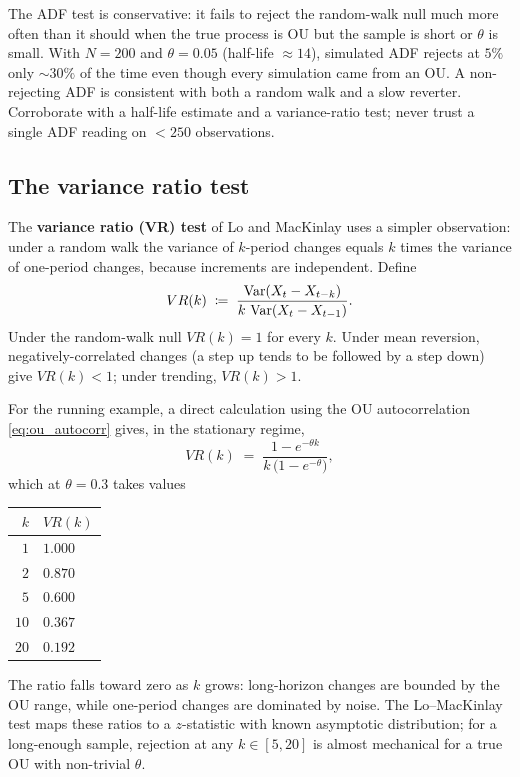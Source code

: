 \begin{pitfallbox}
The ADF test is conservative: it fails to reject the random-walk
null much more often than it should when the true process is OU
but the sample is short or $\theta$ is small. With $N=200$ and
$\theta = 0.05$ (half-life $\approx 14$), simulated ADF rejects
at $5\%$ only $\sim 30\%$ of the time even though every
simulation came from an OU. A non-rejecting ADF is consistent
with both a random walk and a slow reverter. Corroborate with a
half-life estimate and a variance-ratio test; never trust a
single ADF reading on $< 250$ observations.
\end{pitfallbox}

\subsection{The variance ratio test}
\label{subsec:ch9_vrt}

The \textbf{variance ratio (VR) test} of Lo and MacKinlay uses a
simpler observation: under a random walk the variance of
$k$-period changes equals $k$ times the variance of one-period
changes, because increments are independent. Define
\begin{equation}
  VR(k) \;\coloneqq\; \frac{\operatorname{Var}(X_t - X_{t-k})}{k\,\operatorname{Var}(X_t - X_{t-1})}.
  \label{eq:vrt_def}
\end{equation}
Under the random-walk null $VR(k) = 1$ for every $k$. Under mean
reversion, negatively-correlated changes (a step up tends to be
followed by a step down) give $VR(k) < 1$; under trending,
$VR(k) > 1$.

For the running example, a direct calculation using the OU
autocorrelation \eqref{eq:ou_autocorr} gives, in the stationary
regime,
\begin{equation}
  VR(k) \;=\; \frac{1 - e^{-\theta k}}{k\,\bigl(1 - e^{-\theta}\bigr)},
  \label{eq:vrt_ou}
\end{equation}
which at $\theta = 0.3$ takes values
\begin{center}
\begin{tabular}{rl}
\toprule
$k$ & $VR(k)$ \\
\midrule
$1$  & $1.000$ \\
$2$  & $0.870$ \\
$5$  & $0.600$ \\
$10$ & $0.367$ \\
$20$ & $0.192$ \\
\bottomrule
\end{tabular}
\end{center}
The ratio falls toward zero as $k$ grows: long-horizon changes
are bounded by the OU range, while one-period changes are
dominated by noise. The Lo--MacKinlay test maps these ratios to
a $z$-statistic with known asymptotic distribution; for a
long-enough sample, rejection at any $k \in [5, 20]$ is almost
mechanical for a true OU with non-trivial $\theta$.

